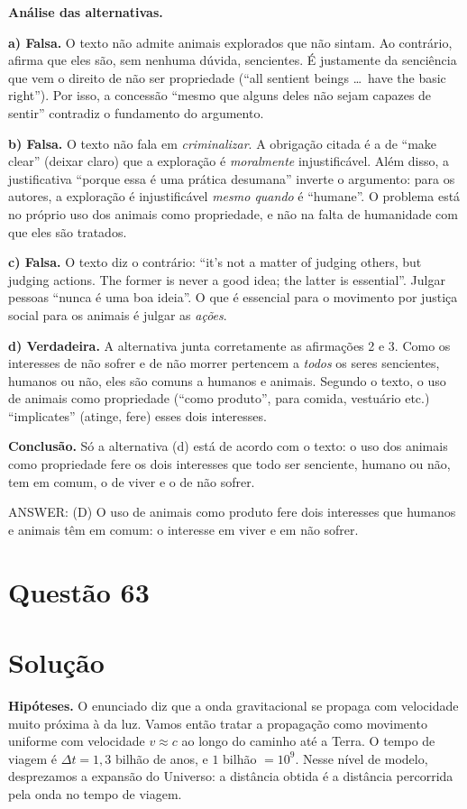 \documentclass{article}%
\begin{document}
\textbf{Análise das alternativas.}

\textbf{a) Falsa.} O texto não admite animais explorados que não sintam. Ao contrário, afirma que eles são, sem nenhuma dúvida, sencientes. É justamente da senciência que vem o direito de não ser propriedade (``all sentient beings \ldots\ have the basic right''). Por isso, a concessão ``mesmo que alguns deles não sejam capazes de sentir'' contradiz o fundamento do argumento.

\textbf{b) Falsa.} O texto não fala em \emph{criminalizar}. A obrigação citada é a de ``make clear'' (deixar claro) que a exploração é \emph{moralmente} injustificável. Além disso, a justificativa ``porque essa é uma prática desumana'' inverte o argumento: para os autores, a exploração é injustificável \emph{mesmo quando} é ``humane''. O problema está no próprio uso dos animais como propriedade, e não na falta de humanidade com que eles são tratados.

\textbf{c) Falsa.} O texto diz o contrário: ``it's not a matter of judging others, but judging actions. The former is never a good idea; the latter is essential''. Julgar pessoas ``nunca é uma boa ideia''. O que é essencial para o movimento por justiça social para os animais é julgar as \emph{ações}.

\textbf{d) Verdadeira.} A alternativa junta corretamente as afirmações 2 e 3. Como os interesses de não sofrer e de não morrer pertencem a \emph{todos} os seres sencientes, humanos ou não, eles são comuns a humanos e animais. Segundo o texto, o uso de animais como propriedade (``como produto'', para comida, vestuário etc.) ``implicates'' (atinge, fere) esses dois interesses.

\textbf{Conclusão.} Só a alternativa (d) está de acordo com o texto: o uso dos animais como propriedade fere os dois interesses que todo ser senciente, humano ou não, tem em comum, o de viver e o de não sofrer.

ANSWER: (D) O uso de animais como produto fere dois interesses que humanos e animais têm em comum: o interesse em viver e em não sofrer.%
\newpage%
\section*{Questão 63}

\section*{Solução}

\textbf{Hipóteses.} O enunciado diz que a onda gravitacional se propaga com velocidade muito próxima à da luz. Vamos então tratar a propagação como movimento uniforme com velocidade $v \approx c$ ao longo do caminho até a Terra. O tempo de viagem é $\Delta t = 1{,}3$ bilhão de anos, e $1$ bilhão $= 10^9$. Nesse nível de modelo, desprezamos a expansão do Universo: a distância obtida é a distância percorrida pela onda no tempo de viagem.
\end{document}
